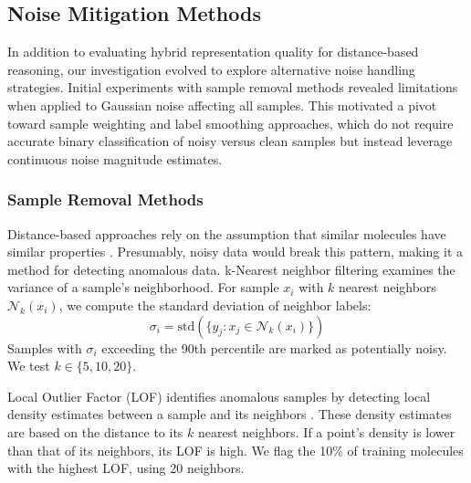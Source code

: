 

\subsection{Noise Mitigation Methods}

In addition to evaluating hybrid representation quality for distance-based reasoning, our investigation evolved to explore alternative noise handling strategies. Initial experiments with sample removal methods revealed limitations when applied to Gaussian noise affecting all samples. This motivated a pivot toward sample weighting and label smoothing approaches, which do not require accurate binary classification of noisy versus clean samples but instead leverage continuous noise magnitude estimates.

\subsubsection{Sample Removal Methods}

Distance-based approaches rely on the assumption that similar molecules have similar properties \citep{Cherkasov2014}. Presumably, noisy data would break this pattern, making it a method for detecting anomalous data. k-Nearest neighbor filtering examines the variance of a sample's neighborhood. For sample $x_i$ with $k$ nearest neighbors $\mathcal{N}_k(x_i)$, we compute the standard deviation of neighbor labels:
\begin{equation}
\sigma_i = \text{std}(\{y_j : x_j \in \mathcal{N}_k(x_i)\})
\end{equation}
Samples with $\sigma_i$ exceeding the 90th percentile are marked as potentially noisy. We test $k \in \{5, 10, 20\}$.

Local Outlier Factor (LOF) identifies anomalous samples by detecting local density estimates between a sample and its neighbors \citep{Breunig2000}. These density estimates are based on the distance to its $k$ nearest neighbors. If a point's density is lower than that of its neighbors, its LOF is high. We flag the 10\% of training molecules with the highest LOF, using 20 neighbors. %

